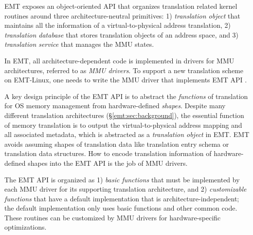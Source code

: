 
\noindent
EMT exposes an object-oriented API that organizes translation related 
	kernel routines around three architecture-neutral
primitives:
1)	{\it translation object} that maintains all the information of 
	a virtual-to-physical address translation,
2) {\it translation database} that stores translation objects
	of an address space, 
and 3) {\it translation service} that manages the MMU states. %

In EMT, all architecture-dependent code is implemented in drivers 
	for MMU architectures,
	referred to as {\it MMU drivers}.
To support a new translation scheme on EMT-Linux,
	one needs to write the MMU driver that implements EMT API
	.


A key design principle of
	the EMT API is to abstract the {\it functions} of translation
	for OS memory management from hardware-defined {\it shapes}.
Despite many different translation architectures (\S\ref{emt:sec:background}),
	the essential function of memory translation is to output the virtual-to-physical
	address mapping and all associated metadata, which is abstracted 
	as a {\it translation object} in EMT.
EMT avoids assuming shapes
	of translation data like translation entry schema
	or translation data structures.
How to encode translation information 
	of hardware-defined shapes into the EMT API is the job of MMU drivers.


The EMT API is organized as 
	1) {\it basic functions} that must be implemented by each MMU driver
	for its supporting translation architecture,
	and 2) {\it customizable functions} that have a default implementation
	that is architecture-independent; the default implementation 
	only uses basic functions and other common code. %
	These routines can be customized by MMU drivers 
	for hardware-specific optimizations.

